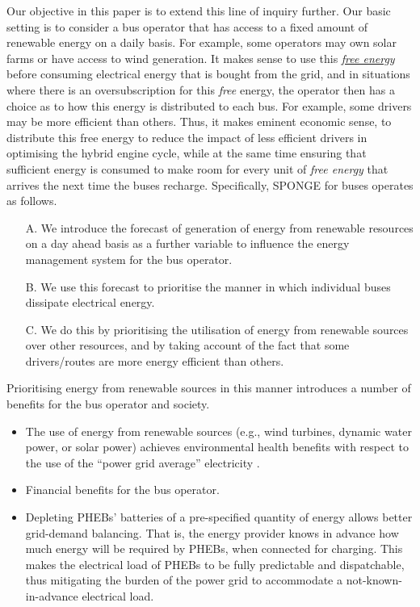 \documentclass[journal]{IEEEtran}
\begin{document}
Our objective in this paper is to extend this line of inquiry further. Our basic setting is to consider a bus operator that has access to a fixed amount of renewable energy on a daily basis. For example, some operators may own solar farms or have access to wind generation. It makes sense to use this \underline{\em free  energy} before consuming electrical energy that is bought from the grid, and in situations where there is an oversubscription for this {\em free} energy, the operator then has a choice as to how this energy is distributed to each bus. For example, some drivers may be more efficient than others. Thus, it makes eminent economic sense, to distribute this free energy to reduce the impact of less efficient drivers in optimising the hybrid engine cycle, while at the same time ensuring that sufficient energy is consumed to make room for every unit of {\em free energy} that arrives the next time the buses recharge. Specifically, SPONGE for buses operates as follows. 
\begin{itemize}
	\item[A.] We introduce the forecast of generation of energy from renewable resources on a day ahead basis as a further variable to influence the energy management system for the bus operator.
	\item[B.] We use this forecast to prioritise the manner in which individual buses dissipate electrical energy.
	\item[C.] We do this by prioritising the utilisation of energy from renewable sources over other resources, and by taking account of the fact that some drivers/routes are more energy efficient than others.
\end{itemize}
Prioritising energy from renewable sources in this manner introduces a number of benefits for the bus operator and society.
\begin{itemize}
	\item The use of energy from renewable sources (e.g., wind turbines, dynamic water power, or solar power) achieves environmental health benefits with respect to the use of the ``power grid average'' electricity \cite{PNAS}.
	\item Financial benefits for the bus operator.
	\item Depleting PHEBs' batteries of a pre-specified quantity of energy allows better grid-demand balancing. That is, the energy provider knows in advance how much energy will be required by PHEBs, when connected for charging. This makes the electrical load of PHEBs to be fully predictable and dispatchable, thus mitigating the burden of the power grid to accommodate a not-known-in-advance electrical load.
\end{itemize}
\end{document}
